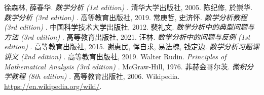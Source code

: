 \documentclass[11pt]{../../TexTemplate/elegantbook}
\begin{document}
\begin{thebibliography}{99} 
 徐森林, 薛春华. \emph{数学分析 (1st edition) }. 清华大学出版社, 2005.
 陈纪修, 於崇华. \emph{数学分析 (3rd edition) }. 高等教育出版社, 2019.
 常庚哲, 史济怀. \emph{数学分析教程 (3rd edition) }. 中国科学技术大学出版社, 2012.
 裴礼文. \emph{数学分析中的典型问题与方法 (3rd edition) }. 高等教育出版社, 2021.
 汪林. \emph{数学分析中的问题与反例 (1st edition) }. 高等教育出版社, 2015.
 谢惠民, 恽自求, 易法槐, 钱定边. \emph{数学分析习题课讲义 (2nd edition) }. 高等教育出版社, 2019.
 Walter Rudin. \emph{Principles of Mathematical Analysis (3rd edition) }. McGraw-Hill, 1976.
 菲赫金哥尔茨. \emph{微积分学教程 (8th edition) }. 高等教育出版社, 2006.
 Wikipedia. \url{https://en.wikipedia.org/wiki/}.
\end{thebibliography}
\end{document}

